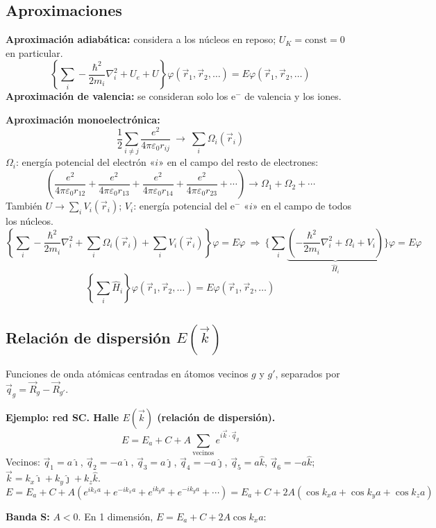 \documentclass[11pt,a4paper]{article}
\newcommand{\ii}{\hat{\imath}}
\newcommand{\jj}{\hat{\jmath}}
\newcommand{\kk}{\hat{k}}
\begin{document}
\subsection{Aproximaciones}
\textbf{Aproximación adiabática:} considera a los núcleos en reposo; $U_K=\text{const}=0$ en particular.
\[
\left\{\sum_i-\frac{\hbar^2}{2m_i}\nabla_i^2+U_e+U\right\}\varphi(\vec r_1,\vec r_2,\ldots)=E\varphi(\vec r_1,\vec r_2,\ldots)
\]
\textbf{Aproximación de valencia:} se consideran solo los e$^-$ de valencia y los iones.

\textbf{Aproximación monoelectrónica:}
\[
\frac12\sum_{i\neq j}\frac{e^2}{4\pi\varepsilon_0r_{ij}}\ \rightarrow\ \sum_i\Omega_i(\vec r_i)
\]
$\Omega_i$: energía potencial del electrón «$i$» en el campo del resto de electrones:
\[
\left(\frac{e^2}{4\pi\varepsilon_0r_{12}}+\frac{e^2}{4\pi\varepsilon_0r_{13}}+\frac{e^2}{4\pi\varepsilon_0r_{14}}+\frac{e^2}{4\pi\varepsilon_0r_{23}}+\cdots\right)\rightarrow\Omega_1+\Omega_2+\cdots
\]
También $U\rightarrow\sum_iV_i(\vec r_i)$; $V_i$: energía potencial del e$^-$ «$i$» en el campo de todos los núcleos.
\[
\left\{\sum_i-\frac{\hbar^2}{2m_i}\nabla_i^2+\sum_i\Omega_i(\vec r_i)+\sum_iV_i(\vec r_i)\right\}\varphi=E\varphi
\ \Rightarrow\
\Bigg\{\sum_i\underbrace{\left(-\frac{\hbar^2}{2m_i}\nabla_i^2+\Omega_i+V_i\right)}_{\hat H_i}\Bigg\}\varphi=E\varphi
\]
\[
\left\{\sum_i\hat H_i\right\}\varphi(\vec r_1,\vec r_2,\ldots)=E\varphi(\vec r_1,\vec r_2,\ldots)
\]

\subsection{Relación de dispersión $E(\vec k)$}
Funciones de onda atómicas centradas en átomos vecinos $g$ y $g'$, separados por $\vec q_g=\vec R_g-\vec R_{g'}$.

\textbf{Ejemplo: red SC. Halle $E(\vec k)$ (relación de dispersión).}
\[
E=E_a+C+A\sum_{\text{vecinos}}e^{i\vec k\cdot\vec q_g}
\]
Vecinos: $\vec q_1=a\ii$, $\vec q_2=-a\ii$, $\vec q_3=a\jj$, $\vec q_4=-a\jj$, $\vec q_5=a\kk$, $\vec q_6=-a\kk$; \
$\vec k=k_x\ii+k_y\jj+k_z\kk$.
\[
E=E_a+C+A\left(e^{ik_xa}+e^{-ik_xa}+e^{ik_ya}+e^{-ik_ya}+\cdots\right)=E_a+C+2A(\cos k_xa+\cos k_ya+\cos k_za)
\]

\textbf{Banda S:} $A<0$. En 1 dimensión, $E=E_a+C+2A\cos k_xa$:
\end{document}
